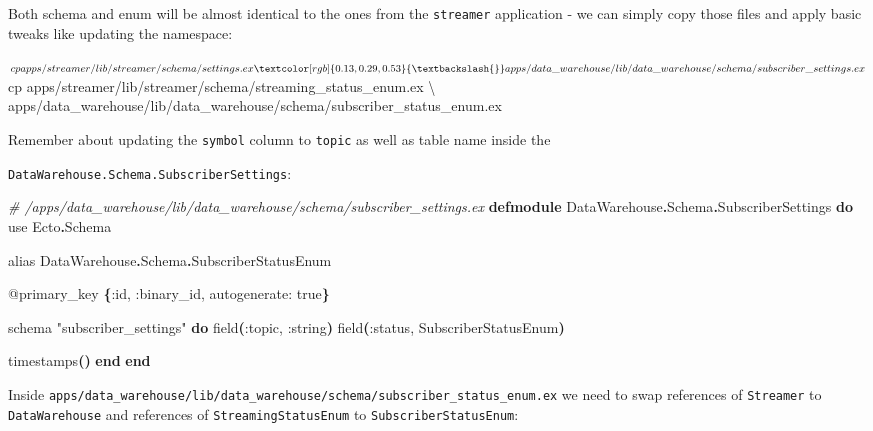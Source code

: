 \documentclass[
  oneside]{book}
\newenvironment{Shaded}{\begin{snugshade}}{\end{snugshade}}
\newcommand{\CommentTok}[1]{\textcolor[rgb]{0.56,0.35,0.01}{\textit{#1}}}
\newcommand{\ConstantTok}[1]{\textcolor[rgb]{0.56,0.35,0.01}{#1}}
\newcommand{\DataTypeTok}[1]{\textcolor[rgb]{0.13,0.29,0.53}{#1}}
\newcommand{\ExtensionTok}[1]{#1}
\newcommand{\FunctionTok}[1]{\textcolor[rgb]{0.13,0.29,0.53}{\textbf{#1}}}
\newcommand{\ImportTok}[1]{#1}
\newcommand{\KeywordTok}[1]{\textcolor[rgb]{0.13,0.29,0.53}{\textbf{#1}}}
\newcommand{\NormalTok}[1]{#1}
\newcommand{\OperatorTok}[1]{\textcolor[rgb]{0.81,0.36,0.00}{\textbf{#1}}}
\newcommand{\OtherTok}[1]{\textcolor[rgb]{0.56,0.35,0.01}{#1}}
\newcommand{\StringTok}[1]{\textcolor[rgb]{0.31,0.60,0.02}{#1}}
\newcommand{\VariableTok}[1]{\textcolor[rgb]{0.00,0.00,0.00}{#1}}
\begin{document}
Both schema and enum will be almost identical to the ones from the \texttt{streamer} application - we can simply copy those files and apply basic tweaks like updating the namespace:

\begin{Shaded}
\begin{Highlighting}[]
\ExtensionTok{$}\NormalTok{ cp apps/streamer/lib/streamer/schema/settings.ex }\DataTypeTok{\textbackslash{}}
\NormalTok{apps/data\_warehouse/lib/data\_warehouse/schema/subscriber\_settings.ex}
\ExtensionTok{$}\NormalTok{ cp apps/streamer/lib/streamer/schema/streaming\_status\_enum.ex }\DataTypeTok{\textbackslash{}}
\NormalTok{apps/data\_warehouse/lib/data\_warehouse/schema/subscriber\_status\_enum.ex}
\end{Highlighting}
\end{Shaded}

Remember about updating the \texttt{symbol} column to \texttt{topic} as well as table name inside the

\texttt{DataWarehouse.Schema.SubscriberSettings}:

\begin{Shaded}
\begin{Highlighting}[]
\CommentTok{\# /apps/data\_warehouse/lib/data\_warehouse/schema/subscriber\_settings.ex}
\KeywordTok{defmodule} \ConstantTok{DataWarehouse}\OperatorTok{.}\ConstantTok{Schema}\OperatorTok{.}\ConstantTok{SubscriberSettings} \KeywordTok{do}
  \ImportTok{use} \ConstantTok{Ecto}\OperatorTok{.}\ConstantTok{Schema}

  \ImportTok{alias} \ConstantTok{DataWarehouse}\OperatorTok{.}\ConstantTok{Schema}\OperatorTok{.}\ConstantTok{SubscriberStatusEnum}

  \OtherTok{@primary\_key} \FunctionTok{\{}\VariableTok{:id}\NormalTok{, }\VariableTok{:binary\_id}\NormalTok{, }\VariableTok{autogenerate:} \ConstantTok{true}\FunctionTok{\}}

\NormalTok{  schema }\StringTok{"subscriber\_settings"} \KeywordTok{do}
\NormalTok{    field}\FunctionTok{(}\VariableTok{:topic}\NormalTok{, }\VariableTok{:string}\FunctionTok{)}
\NormalTok{    field}\FunctionTok{(}\VariableTok{:status}\NormalTok{, }\ConstantTok{SubscriberStatusEnum}\FunctionTok{)}

\NormalTok{    timestamps}\FunctionTok{()}
  \KeywordTok{end}
\KeywordTok{end}
\end{Highlighting}
\end{Shaded}

Inside \texttt{apps/data\_warehouse/lib/data\_warehouse/schema/subscriber\_status\_enum.ex} we need to swap references of \texttt{Streamer} to \texttt{DataWarehouse} and references of \texttt{StreamingStatusEnum} to \texttt{SubscriberStatusEnum}:
\end{document}
